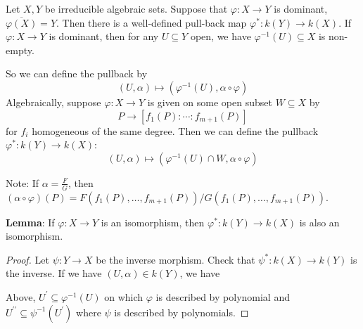 \documentclass{report}
\begin{document}
Let $X, Y$ be irreducible algebraic sets. Suppose that $\varphi : X \rightarrow Y$ is dominant, $\overline{\varphi (X)} = Y$. Then there is a well-defined pull-back map $\varphi^{*} : k(Y) \rightarrow k(X)$. If $\varphi: X \rightarrow Y$ is dominant, then for any $U \subseteq Y$ open, we have $\varphi^{-1}(U) \subseteq X$ is non-empty.

So we can define the pullback by
    \begin{equation*}
        (U, \alpha) \mapsto (\varphi^{-1}(U), \alpha \circ \varphi)
    \end{equation*}
Algebraically, suppose $\varphi : X \rightarrow Y$ is given on some open subset $W \subseteq X$ by
    \begin{equation*}
        P \rightarrow [f_{1}(P) : \cdots : f_{m + 1}(P)]
    \end{equation*}
for $f_{i}$ homogeneous of the same degree. Then we can define the pullback $\varphi^{*}: k(Y) \rightarrow k(X)$:
    \begin{equation*}
        (U, \alpha) \mapsto (\varphi^{-1}(U) \cap W, \alpha \circ \varphi)
    \end{equation*}

Note: If $\alpha = \frac{F}{G}$, then $(\alpha \circ \varphi) (P) = F(f_{1}(P), \ldots, f_{m + 1}(P))/G(f_{1}(P), \ldots, f_{m + 1}(P))$.

\textbf{Lemma}: If $\varphi : X \rightarrow Y$ is an isomorphism, then $\varphi^{*}: k(Y) \rightarrow k(X)$ is also an isomorphism.
    \begin{proof}
        Let $\psi : Y \rightarrow X$ be the inverse morphism. Check that $\psi^{*} : k(X) \rightarrow k(Y)$ is the inverse. If we have $(U, \alpha) \in k(Y)$, we have
            \begin{center}
            \end{center}
         Above, $U^{\prime} \subseteq \varphi^{-1}(U)$ on which $\varphi$ is described by polynomial and $U^{\prime\prime} \subseteq \psi^{-1}(U^{\prime})$ where $\psi$ is described by polynomials.
    \end{proof}
\end{document}
